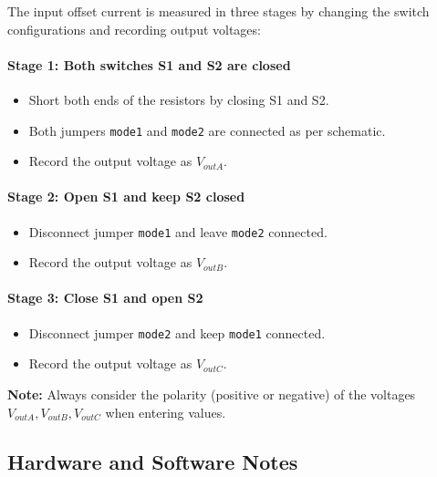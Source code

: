 \documentclass[a4paper,12pt]{article}
\begin{document}
The input offset current is measured in three stages by changing the switch configurations and recording output voltages:

\paragraph*{Stage 1: Both switches S1 and S2 are closed}
\begin{itemize}
  \item Short both ends of the resistors by closing S1 and S2.
  \item Both jumpers \texttt{mode1} and \texttt{mode2} are connected as per schematic.
  \item Record the output voltage as \( V_{outA} \).
\end{itemize}

\paragraph*{Stage 2: Open S1 and keep S2 closed}
\begin{itemize}
  \item Disconnect jumper \texttt{mode1} and leave \texttt{mode2} connected.
  \item Record the output voltage as \( V_{outB} \).
\end{itemize}

\paragraph*{Stage 3: Close S1 and open S2}
\begin{itemize}
  \item Disconnect jumper \texttt{mode2} and keep \texttt{mode1} connected.
  \item Record the output voltage as \( V_{outC} \).
\end{itemize}

\textbf{Note:} Always consider the polarity (positive or negative) of the voltages \( V_{outA}, V_{outB}, V_{outC} \) when entering values.

\subsection*{Hardware and Software Notes}
\end{document}
